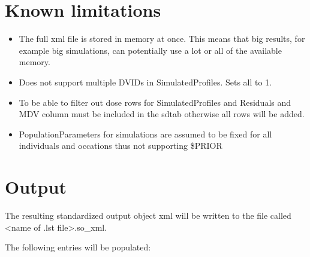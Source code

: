 \section{Known limitations}
\begin{itemize}
    \item The full xml file is stored in memory at once. This means that big results, for example big simulations, can potentially use a lot or all of the available memory.
    \item Does not support multiple DVIDs in SimulatedProfiles. Sets all to 1.
    \item To be able to filter out dose rows for SimulatedProfiles and Residuals and MDV column must be included in the sdtab otherwise all rows will be added.
    \item PopulationParameters for simulations are assumed to be fixed for all individuals and occations thus not supporting \$PRIOR
\end{itemize}

\section{Output}

The resulting standardized output object xml will be written to the file called <name of .lst file>.so\_xml.

The following entries will be populated:

